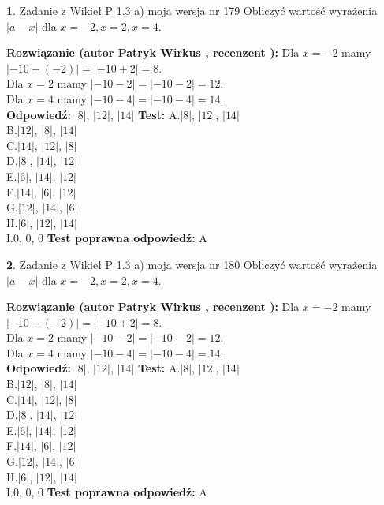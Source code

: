 \documentclass[12pt, a4paper]{article}
\theoremstyle{definition} %
\newtheorem{zad}{}
\newcommand{\zadStart}[1]{\begin{zad}#1\newline}
\newcommand{\zadStop}{\end{zad}}
\newcommand{\rozwStart}[2]{\noindent \textbf{Rozwiązanie (autor #1 , recenzent #2): }\newline}
\newcommand{\rozwStop}{\newline}
\newcommand{\odpStart}{\noindent \textbf{Odpowiedź:}\newline}
\newcommand{\odpStop}{\newline}
\newcommand{\testStart}{\noindent \textbf{Test:}\newline}
\newcommand{\testStop}{\newline}
\newcommand{\kluczStart}{\noindent \textbf{Test poprawna odpowiedź:}\newline}
\newcommand{\kluczStop}{\newline}
\begin{document}
\zadStart{Zadanie z Wikieł P 1.3 a) moja wersja nr 179}
Obliczyć wartość wyrażenia $|a - x|$ dla $x=-2,x=2,x=4$.
\zadStop
\rozwStart{Patryk Wirkus}{}
Dla $x = -2$ mamy $|-10 - (-2)| = |-10 + 2| = 8$.\\
Dla $x = 2$ mamy $|-10 - 2| = |-10 - 2| = 12$.\\
Dla $x = 4$ mamy $|-10 - 4| = |-10 - 4| = 14$.\\
\rozwStop
\odpStart
$|8|$, $|12|$, $|14|$
\odpStop
\testStart
A.$|8|$, $|12|$, $|14|$\\
B.$|12|$, $|8|$, $|14|$\\
C.$|14|$, $|12|$, $|8|$\\
D.$|8|$, $|14|$, $|12|$\\
E.$|6|$, $|14|$, $|12|$\\
F.$|14|$, $|6|$, $|12|$\\
G.$|12|$, $|14|$, $|6|$\\
H.$|6|$, $|12|$, $|14|$\\
I.$0$, $0$, $0$
\testStop
\kluczStart
A
\kluczStop



\zadStart{Zadanie z Wikieł P 1.3 a) moja wersja nr 180}
Obliczyć wartość wyrażenia $|a - x|$ dla $x=-2,x=2,x=4$.
\zadStop
\rozwStart{Patryk Wirkus}{}
Dla $x = -2$ mamy $|-10 - (-2)| = |-10 + 2| = 8$.\\
Dla $x = 2$ mamy $|-10 - 2| = |-10 - 2| = 12$.\\
Dla $x = 4$ mamy $|-10 - 4| = |-10 - 4| = 14$.\\
\rozwStop
\odpStart
$|8|$, $|12|$, $|14|$
\odpStop
\testStart
A.$|8|$, $|12|$, $|14|$\\
B.$|12|$, $|8|$, $|14|$\\
C.$|14|$, $|12|$, $|8|$\\
D.$|8|$, $|14|$, $|12|$\\
E.$|6|$, $|14|$, $|12|$\\
F.$|14|$, $|6|$, $|12|$\\
G.$|12|$, $|14|$, $|6|$\\
H.$|6|$, $|12|$, $|14|$\\
I.$0$, $0$, $0$
\testStop
\kluczStart
A
\kluczStop
\end{document}
